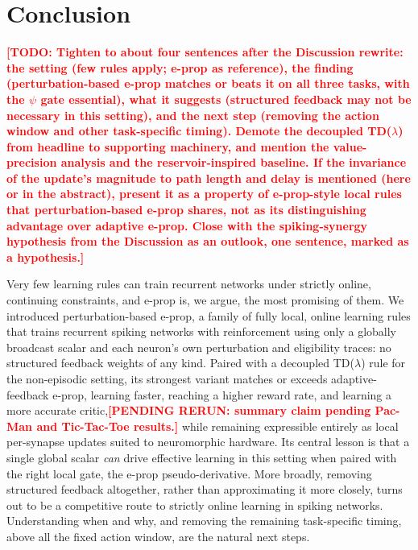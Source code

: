 \documentclass[10pt,twocolumn]{article}
\newcommand{\pending}[1]{\textcolor{red}{\bfseries[PENDING RERUN#1]}}
\newcommand{\todo}[1]{\textcolor{red}{\bfseries[TODO: #1]}}
\newcommand{\method}{perturbation-based e-prop}   %
\begin{document}
\section{Conclusion}
\label{sec:conclusion}

\todo{Tighten to about four sentences after the Discussion rewrite: the
setting (few rules apply; e-prop as reference), the finding (\method{} matches or beats it on all three tasks, with the $\psi$ gate
essential), what it suggests (structured feedback may not be necessary in
this setting), and the next step (removing the action window and other
task-specific timing). Demote the decoupled TD($\lambda$) from headline to
supporting machinery, and mention the value-precision analysis and the
reservoir-inspired baseline. If the invariance of the update's magnitude to
path length and delay is mentioned (here or in the abstract), present it as a
property of e-prop-style local rules that \method{} shares, not as
its distinguishing advantage over adaptive e-prop. Close with the spiking-synergy hypothesis from
the Discussion as an outlook, one sentence, marked as a hypothesis.}

Very few learning rules can train recurrent networks under strictly online,
continuing constraints, and e-prop is, we argue, the most promising of them.
We introduced \method{}, a family of fully local, online learning
rules that trains recurrent spiking networks with reinforcement using only a
globally broadcast scalar and each neuron's own perturbation and eligibility
traces: no structured feedback weights of any kind. Paired with a decoupled
TD($\lambda$) rule for the non-episodic setting, its strongest variant matches
or exceeds adaptive-feedback e-prop, learning faster, reaching a higher reward
rate, and learning a more accurate critic,\pending{: summary claim pending
Pac-Man and Tic-Tac-Toe results.} while remaining expressible entirely as local
per-synapse updates suited to neuromorphic hardware. Its central lesson is that
a single global scalar \emph{can} drive effective learning in this setting when
paired with the right local gate, the e-prop pseudo-derivative. More broadly,
removing structured feedback altogether, rather than approximating it more
closely, turns out to be a competitive route to strictly online learning in
spiking networks. Understanding when and why, and removing the remaining
task-specific timing, above all the fixed action window, are the natural next
steps.



\end{document}
